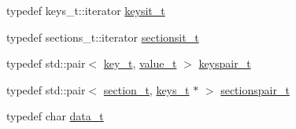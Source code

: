 \begin{DoxyCompactItemize}
\item 
typedef keys\+\_\+t\+::iterator \hyperlink{class_i_n_i_ae33c58e217d5ee3fbc8cae737560ce53}{keysit\+\_\+t}
\item 
typedef sections\+\_\+t\+::iterator \hyperlink{class_i_n_i_a847131e25df0c4d420599b1990a21132}{sectionsit\+\_\+t}
\item 
typedef std\+::pair$<$ \hyperlink{class_i_n_i_acfa659efbac1eb0c62c1a910b0b09541}{key\+\_\+t}, \hyperlink{class_i_n_i_aeda858880798b4d54ba09bbd00ee1683}{value\+\_\+t} $>$ \hyperlink{class_i_n_i_a74debe5259e76d734b5376c99b0ba1c8}{keyspair\+\_\+t}
\item 
typedef std\+::pair$<$ \hyperlink{class_i_n_i_a82551bff97cdd5c7ff183b24bd9b2188}{section\+\_\+t}, \hyperlink{class_i_n_i_a4254e881abdbf891a408cb032e0d717d}{keys\+\_\+t} $\ast$ $>$ \hyperlink{class_i_n_i_a87b850df48a4bf8c792df26927dec359}{sectionspair\+\_\+t}
\item 
typedef char \hyperlink{class_i_n_i_a611e44f4d3abb28d901f7e2aaf183811}{data\+\_\+t}
\end{DoxyCompactItemize}
